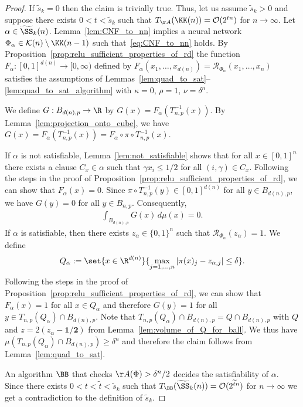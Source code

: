 \documentclass{amsart}[11pt]
\numberwithin{equation}{section}
\newcommand{\realization}{\mathcal{R}}
\newcommand{\order}{\mathcal{O}}
\newcommand{\worstTime}{T}
\numberwithin{theorem}{section}
\begin{document}
\begin{proof}
    If $\widetilde s_k = 0$ then the claim is trivially true. Thus, let us assume $\widetilde s_k > 0$ and suppose there exists $0 < t < \widetilde s_k$ such that $\worstTime_{\AA}(\KK(n)) = \order(2^{tn})$ for $n \to \infty$. Let $\alpha\in \widetilde \SS_k(n)$. Lemma~\ref{lem:CNF_to_nn} implies a neural network $\Phi_\alpha \in \mathcal{K}(n) \setminus  \KK(n - 1)$ such that~\eqref{eq:CNF_to_nn} holds. By Proposition~\ref{prop:relu_sufficient_properties_of_rd} the function $F_\alpha: [0, 1]^{d(n)} \to [0, \infty)$ defined by $F_\alpha(x_1,\ldots,x_{d(n)}) = \realization_{\Phi_\alpha}(x_1,\ldots,x_n)$ satisfies the assumptions of Lemmas~\ref{lem:quad_to_sat}--\ref{lem:quad_to_sat_algorithm} with $\kappa=0$, $\rho=1$, $\nu = \delta^n$. 
    
    We define $G: B_{d(n), p} \to \R$ by $G(x) = F_\alpha(T_{n, p}^{-1}(x))$. By Lemma~\ref{lem:projection_onto_cube}, we have $G(x) = F_\alpha(T_{n, p}^{-1}(x)) = F_\alpha \circ \pi \circ T_{n, p}^{-1}(x)$.

    If $\alpha$ is not satisfiable, Lemma~\ref{lem:not_satisfiable} shows that for all $x \in [0, 1]^n$ there exists a clause $C_x \in \alpha$  such that $\gamma x_i \leq 1/2$ for all $(i, \gamma) \in C_x$. Following the steps in the proof of Proposition~\ref{prop:relu_sufficient_properties_of_rd}, we can show that $F_\alpha(x) = 0$. Since $\pi \circ T_{n, p}^{-1}(y) \in [0, 1]^{d(n)}$ for all $y \in B_{d(n), p}$, we have $G(y) = 0$ for all $y \in B_{n, p}$. Consequently,
    \begin{align*}
        \int_{B_{d(n), p}} G(x) \, d\mu(x) = 0.
    \end{align*}    
    If $\alpha$ is satisfiable, then there exists $z_\alpha \in \{0, 1\}^n$ such that $\realization_{\Phi_\alpha}(z_\alpha) = 1$. We define 
    \begin{align*}
        Q_\alpha := \set{x \in \R^{d(n)}}{ \max_{j = 1,\ldots,n} |\pi(x)_j - z_{\alpha, j}| \leq \delta}.
    \end{align*}
    Following the steps in the proof of Proposition~\ref{prop:relu_sufficient_properties_of_rd}, we can show that $F_\alpha(x) = 1$ for all $x \in Q_\alpha$ and therefore $G(y) = 1$ for all $y \in T_{n, p}(Q_\alpha) \cap B_{d(n), p}$.
   Note that $T_{n, p}(Q_\alpha) \cap B_{d(n), p} = Q\cap B_{d(n),p}$ with $Q$ and $z=2(z_\alpha -\boldsymbol{1/2})$  from Lemma~\ref{lem:volume_of_Q_for_ball}.
    We thus have $\mu(T_{n, p}(Q_\alpha) \cap B_{d(n), p}) \geq \delta^n$ and therefore the claim follows from Lemma~\ref{lem:quad_to_sat}.
    
     An algorithm $\BB$ that checks $\AA(\Phi) > \delta^{n}/2$ decides the satisfiability of $\alpha$. Since there exists $0 < t < \widetilde t < \widetilde s_k$ such that $\worstTime_{\BB}(\widetilde \SS_k(n)) = \order(2^{\widetilde t n})$ for $n \to \infty$ we get a contradiction to the definition of $\widetilde s_k$.
\end{proof}
\end{document}
